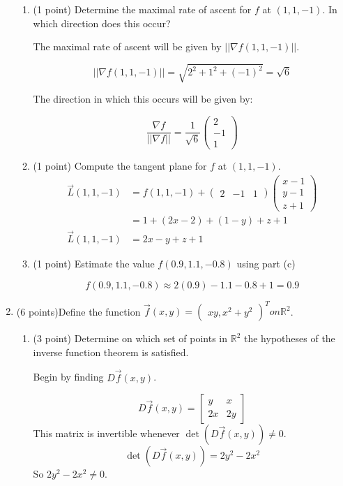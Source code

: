 \documentclass{article}
\begin{document}
\begin{enumerate}
\begin{enumerate}[label= (\alph*)]
\item (1 point) Determine the maximal rate of ascent for $f$ at $(1, 1, -1)$. In which
direction does this occur?

The maximal rate of ascent will be given by $||\nabla f(1,1,-1)||$.

$$||\nabla f(1,1,-1)||=\sqrt{2^2+1^2+(-1)^2} = \sqrt{6}$$

The direction in which this occurs will be given by:

$$\frac{\nabla f}{||\nabla f||}=\frac{1}{\sqrt{6}}\begin{pmatrix}
    2\\-1\\1
\end{pmatrix}$$

\item (1 point) Compute the tangent plane for $f$ at $(1, 1, -1)$.
\begin{align*} 
\vec L(1,1,-1)&=f(1,1,-1)+\begin{pmatrix}2&-1&1\end{pmatrix}\begin{pmatrix}x-1\\y-1\\z+1\end{pmatrix}\\
&=1+(2x-2)+(1-y)+z+1\\
\vec L(1,1,-1)&=2x-y+z+1
\end{align*}
\item (1 point) Estimate the value $f (0.9, 1.1, -0.8)$ using part (c)

$$f (0.9, 1.1, -0.8)\approx 2(0.9)-1.1-0.8+1=0.9$$
\end{enumerate}

\item (6 points)Define the function $\vec f (x, y) = \begin{pmatrix}xy, x^2 + y^2\end{pmatrix}^T on \mathbb{R}^2$.
\begin{enumerate}[label= (\alph*)]  
\item (3 point) Determine on which set of points in $\mathbb{R}^2$ the hypotheses of the inverse
function theorem is satisfied.

Begin by finding $D\vec f(x,y)$.

$$D\vec f(x,y)=\begin{bmatrix}
    y&x\\
    2x&2y
\end{bmatrix}$$
This matrix is invertible whenever $\det(D\vec f(x,y))\neq0$.
$$\det(D\vec f(x,y))=2y^2-2x^2$$
So $2y^2-2x^2\neq0$.


\end{enumerate}
\end{enumerate}
\end{document}
